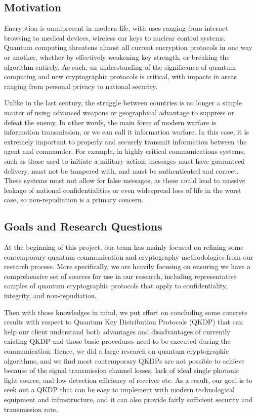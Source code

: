 \documentclass[sigconf]{acmart}
\begin{document}
\subsection{Motivation}
Encryption is omnipresent in modern life, with uses ranging from internet browsing to medical devices, wireless car keys to nuclear control systems. Quantum computing threatens almost all current encryption protocols in one way or another, whether by effectively weakening key strength, or breaking the algorithm entirely. As such, an understanding of the significance of quantum computing and new cryptographic protocols is critical, with impacts in areas ranging from personal privacy to national security.

Unlike in the last century, the struggle between countries is no longer a simple matter of using advanced weapons or geographical advantage to suppress or defeat the enemy. 
In other words, the main force of modern warfare is information transmission, or we can call it information warfare. %
In this case, it is extremely important to properly and securely transmit information between the agent and commander. %
For example, in highly critical communications systems, such as those used to initiate a military action, messages must have guaranteed delivery, must not be tampered with, and must be authenticated and correct. These systems must not allow for false messages, as these could lead to massive leakage of national confidentialities or even widespread loss of life in the worst case, so non-repudiation is a primary concern.
 
\subsection{Goals and Research Questions}
At the beginning of this project, our team has mainly focused on refining some contemporary quantum communication and cryptography methodologies from our research process. More specifically, we are heavily focusing on ensuring we have a comprehensive set of sources for use in our research, including representative samples of quantum cryptographic protocols that apply to confidentiality, integrity, and non-repudiation.

Then with those knowledges in mind, we put effort on concluding some concrete results with respect to Quantum Key Distribution Protocols (QKDP) that can help our client understand both advantages and disadvantages of currently existing QKDP and those basic procedures need to be executed during the communication. Hence, we did a large research on quantum cryptographic algorithms, and we find most contemporary QKDPs are not possible to achieve because of the signal transmission channel losses, lack of ideal single photonic light source, and low detection efficiency of receiver etc. As a result, our goal is to seek out a QKDP that can be easy to implement with modern technological equipment and infrastructure, and it can also provide fairly sufficient security and transmission rate. 
\end{document}
